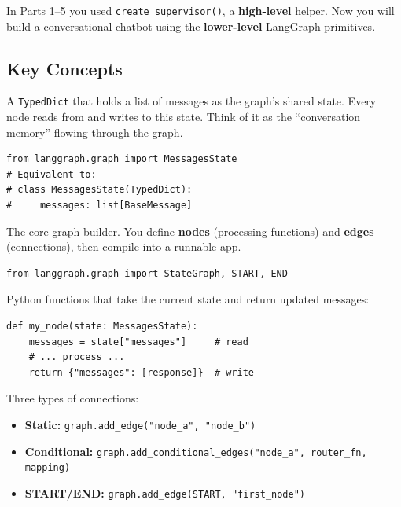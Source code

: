 \documentclass[11pt, letterpaper]{article}
\begin{document}
In Parts 1--5 you used \texttt{create\_supervisor()}, a \textbf{high-level} helper. Now you will build a conversational chatbot using the \textbf{lower-level} LangGraph primitives.

\subsection*{Key Concepts}

\begin{description}[style=nextline, leftmargin=2em]
  \item[\texttt{MessagesState}]
    A \texttt{TypedDict} that holds a list of messages as the graph's shared state. Every node reads from and writes to this state. Think of it as the ``conversation memory'' flowing through the graph.

    \begin{lstlisting}
from langgraph.graph import MessagesState
# Equivalent to:
# class MessagesState(TypedDict):
#     messages: list[BaseMessage]
    \end{lstlisting}

  \item[\texttt{StateGraph}]
    The core graph builder. You define \textbf{nodes} (processing functions) and \textbf{edges} (connections), then compile into a runnable app.

    \begin{lstlisting}
from langgraph.graph import StateGraph, START, END
    \end{lstlisting}

  \item[Nodes]
    Python functions that take the current state and return updated messages:

    \begin{lstlisting}
def my_node(state: MessagesState):
    messages = state["messages"]     # read
    # ... process ...
    return {"messages": [response]}  # write
    \end{lstlisting}

  \item[Edges]
    Three types of connections:
    \begin{itemize}[nosep]
      \item \textbf{Static:} \texttt{graph.add\_edge("node\_a", "node\_b")}
      \item \textbf{Conditional:} \texttt{graph.add\_conditional\_edges("node\_a", router\_fn, mapping)}
      \item \textbf{START/END:} \texttt{graph.add\_edge(START, "first\_node")}
    \end{itemize}
\end{description}
\end{document}
